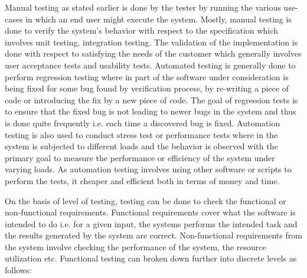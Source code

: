 Manual testing as stated earlier is done by the tester by running the various use-cases in which an end user might execute the system. Mostly, manual testing is done to verify the system's behavior with respect to the specification which involves unit testing, integration testing. The validation of the implementation is done with respect to satisfying the needs of the customer which generally involves user acceptance tests and usability tests. Automated testing is generally done to perform regression testing where in part of the software under consideration is being fixed for some bug found by verification process, by re-writing a piece of code or introducing the fix by a new piece of code. The goal of regression tests is to ensure that the fixed bug is not leading to newer bugs in the system and thus is done quite frequently i.e. each time a discovered bug is fixed. Automation testing is also used to conduct stress test or performance tests where in the system is subjected to different loads and the behavior is observed with the primary goal to measure the performance or efficiency of the system under varying loads. As automation testing involves using other software or scripts to perform the tests, it cheaper and efficient both in terms of money and time. \newline 

On the basis of level of testing, testing can be done to check the functional or non-functional requirements. Functional requirements cover what the software is intended to do i.e. for a given input, the systems performs the intended task and the results generated by the system are correct. Non-functional requirements from the system involve checking the performance of the system, the resource utilization etc. Functional testing can broken down further into discrete levels as follows: 

